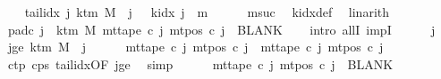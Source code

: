 \begin{isabellebody}
\ \ \isamarkupfalse%
\ tail{\isacharunderscore}{\kern0pt}idx{\isacharcolon}{\kern0pt}\ {\isachardoublequoteopen}{\isasymAnd}j{\isachardot}{\kern0pt}\ k{\isacharunderscore}{\kern0pt}tm\ M\ {\isasymle}\ j\ {\isasymLongrightarrow}\ {\isasymnot}\ k{\isacharunderscore}{\kern0pt}idx\ j\ {\isacharless}{\kern0pt}\ {\isacharquery}{\kern0pt}m{}{\isachardoublequoteclose}\isanewline
\ \ \ \ \isamarkupfalse%
\ m{}suc\ \isamarkupfalse%
\ k{\isacharunderscore}{\kern0pt}idx{\isacharunderscore}{\kern0pt}def\ \isamarkupfalse%
\ linarith\isanewline
\ \ \isamarkupfalse%
\ pad{\isacharunderscore}{\kern0pt}c{}{\isacharcolon}{\kern0pt}\ {\isachardoublequoteopen}{\isasymforall}j\ {\isasymge}\ k{\isacharunderscore}{\kern0pt}tm\ M{\isachardot}{\kern0pt}\ mt{\isacharunderscore}{\kern0pt}tape\ c{}\ j\ {\isacharparenleft}{\kern0pt}mt{\isacharunderscore}{\kern0pt}pos\ c{}\ j{\isacharparenright}{\kern0pt}\ {\isacharequal}{\kern0pt}\ BLANK{}{\isachardoublequoteclose}\isanewline
\ \ \isamarkupfalse%
\ {\isacharparenleft}{\kern0pt}intro\ allI\ impI{\isacharparenright}{\kern0pt}\isanewline
\ \ \ \ \isamarkupfalse%
\ j\ \isamarkupfalse%
\ jge{\isacharcolon}{\kern0pt}\ {\isachardoublequoteopen}k{\isacharunderscore}{\kern0pt}tm\ M\ {\isasymle}\ j{\isachardoublequoteclose}\isanewline
\ \ \ \ \isamarkupfalse%
\ {\isachardoublequoteopen}mt{\isacharunderscore}{\kern0pt}tape\ c{}\ j\ {\isacharparenleft}{\kern0pt}mt{\isacharunderscore}{\kern0pt}pos\ c{}\ j{\isacharparenright}{\kern0pt}\ {\isacharequal}{\kern0pt}\ mt{\isacharunderscore}{\kern0pt}tape\ c{}\ j\ {\isacharparenleft}{\kern0pt}mt{\isacharunderscore}{\kern0pt}pos\ c{}\ j{\isacharparenright}{\kern0pt}{\isachardoublequoteclose}\isanewline
\ \ \ \ \ \ \isamarkupfalse%
\ c{}{\isacharunderscore}{\kern0pt}tp\ c{}{\isacharunderscore}{\kern0pt}ps\ tail{\isacharunderscore}{\kern0pt}idx{\isacharbrackleft}{\kern0pt}OF\ jge{\isacharbrackright}{\kern0pt}\ \isamarkupfalse%
\ simp\isanewline
\ \ \ \ \isamarkupfalse%
\ {\isachardoublequoteopen}mt{\isacharunderscore}{\kern0pt}tape\ c{}\ j\ {\isacharparenleft}{\kern0pt}mt{\isacharunderscore}{\kern0pt}pos\ c{}\ j{\isacharparenright}{\kern0pt}\ {\isacharequal}{\kern0pt}\ BLANK{}{\isachardoublequoteclose}\ \isamarkupfalse%

\end{isabellebody}
